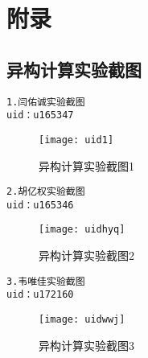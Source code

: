 
\chapter{附录}

\section{异构计算实验截图}
\begin{verbatim}
1.闫佑诚实验截图
uid：u165347
\end{verbatim}
\begin{figure}[htbp]
    \centering
    \texttt{[image: uid1]}
    \caption{异构计算实验截图1}\label{fig:UID1}
    \vspace{\baselineskip}
    \end{figure}
    
\begin{verbatim}
2.胡亿权实验截图
uid：u165346
\end{verbatim}
\begin{figure}[htbp]
    \centering
    \texttt{[image: uidhyq]}
    \caption{异构计算实验截图2}\label{fig:UID2}
    \vspace{\baselineskip}
    \end{figure}


\begin{verbatim}
3.韦唯佳实验截图
uid：u172160
\end{verbatim}
\begin{figure}[htbp]
\centering
\texttt{[image: uidwwj]}
\caption{异构计算实验截图3}\label{fig:UID3}
\vspace{\baselineskip}
\end{figure}

